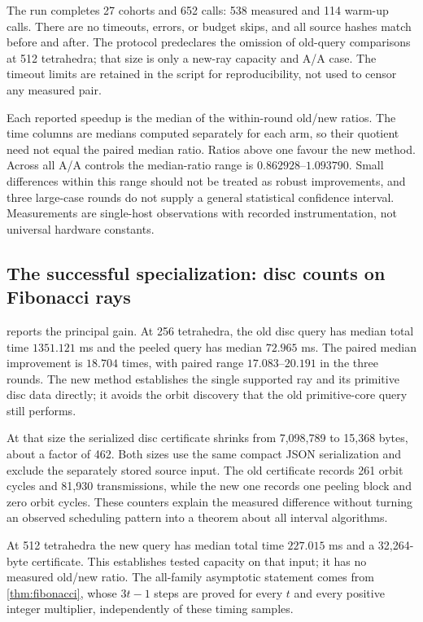 The run completes 27 cohorts and 652 calls: 538 measured and 114 warm-up
calls.  There are no timeouts, errors, or budget skips, and all source hashes
match before and after.  The protocol predeclares the omission of old-query
comparisons at 512 tetrahedra; that size is only a new-ray capacity and A/A
case.  The timeout limits are retained in the script for reproducibility,
not used to censor any measured pair.

Each reported speedup is the median of the within-round old/new ratios.
The time columns are medians computed separately for each arm, so their
quotient need not equal the paired median ratio.  Ratios above one favour the
new method.  Across all A/A controls the median-ratio range is
$0.862928$--$1.093790$.  Small differences within this range should not be
treated as robust improvements, and three large-case rounds do not supply
a general statistical confidence interval.  Measurements are single-host
observations with recorded instrumentation, not universal hardware constants.



\subsection{The successful specialization: disc counts on Fibonacci rays}

 reports the principal gain.  At 256 tetrahedra, the old
disc query has median total time $1351.121$ ms and the peeled query has median
$72.965$ ms.  The paired median improvement is $18.704$ times, with paired
range $17.083$--$20.191$ in the three rounds.  The new method establishes the
single supported ray and its primitive disc data directly; it avoids the
orbit discovery that the old primitive-core query still performs.

At that size the serialized disc certificate shrinks from 7,098,789 to
15,368 bytes, about a factor of 462.  Both sizes use the same compact JSON
serialization and exclude the separately stored source input.  The old
certificate records 261 orbit cycles and 81,930 transmissions, while the new
one records one peeling block and zero orbit cycles.  These counters explain
the measured difference without turning an observed scheduling pattern into
a theorem about all interval algorithms.

At 512 tetrahedra the new query has median total time $227.015$ ms and a
32,264-byte certificate.  This establishes tested capacity on that input;
it has no measured old/new ratio.  The all-family asymptotic statement comes
from \cref{thm:fibonacci}, whose $3t-1$ steps are proved for every $t$ and
every positive integer multiplier, independently of these timing samples.

